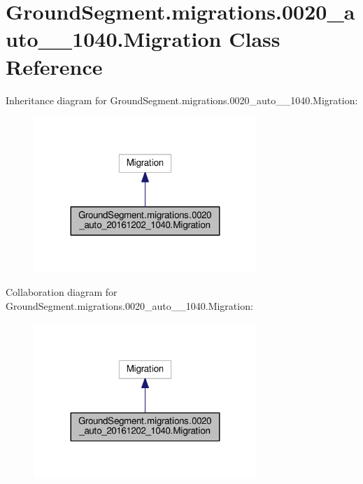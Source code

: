 \hypertarget{class_ground_segment_1_1migrations_1_10020__auto__20161202__1040_1_1_migration}{}\section{Ground\+Segment.\+migrations.0020\+\_\+auto\+\_\+\_\+1040.Migration Class Reference}
\label{class_ground_segment_1_1migrations_1_10020__auto__20161202__1040_1_1_migration}


Inheritance diagram for Ground\+Segment.\+migrations.0020\+\_\+auto\+\_\+\_\+1040.Migration\+:\nopagebreak
\begin{figure}[H]
\begin{center}
\leavevmode
\includegraphics[width=239pt]{class_ground_segment_1_1migrations_1_10020__auto__20161202__1040_1_1_migration__inherit__graph}
\end{center}
\end{figure}


Collaboration diagram for Ground\+Segment.\+migrations.0020\+\_\+auto\+\_\+\_\+1040.Migration\+:\nopagebreak
\begin{figure}[H]
\begin{center}
\leavevmode
\includegraphics[width=239pt]{class_ground_segment_1_1migrations_1_10020__auto__20161202__1040_1_1_migration__coll__graph}
\end{center}
\end{figure}
